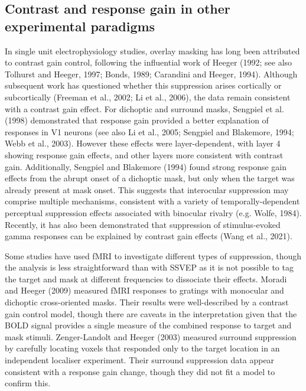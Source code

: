 \documentclass[]{article}
\begin{document}
\hypertarget{contrast-and-response-gain-in-other-experimental-paradigms}{%
\subsection{Contrast and response gain in other experimental paradigms}\label{contrast-and-response-gain-in-other-experimental-paradigms}}

In single unit electrophysiology studies, overlay masking has long been attributed to contrast gain control, following the influential work of Heeger (1992; see also Tolhurst and Heeger, 1997; Bonds, 1989; Carandini and Heeger, 1994). Although subsequent work has questioned whether this suppression arises cortically or subcortically (Freeman et al., 2002; Li et al., 2006), the data remain consistent with a contrast gain effect. For dichoptic and surround masks, Sengpiel et al. (1998) demonstrated that response gain provided a better explanation of responses in V1 neurons (see also Li et al., 2005; Sengpiel and Blakemore, 1994; Webb et al., 2003). However these effects were layer-dependent, with layer 4 showing response gain effects, and other layers more consistent with contrast gain. Additionally, Sengpiel and Blakemore (1994) found strong response gain effects from the abrupt onset of a dichoptic mask, but only when the target was already present at mask onset. This suggests that interocular suppression may comprise multiple mechanisms, consistent with a variety of temporally-dependent perceptual suppression effects associated with binocular rivalry (e.g. Wolfe, 1984). Recently, it has also been demonstrated that suppression of stimulus-evoked gamma responses can be explained by contrast gain effects (Wang et al., 2021).

Some studies have used fMRI to investigate different types of suppression, though the analysis is less straightforward than with SSVEP as it is not possible to tag the target and mask at different frequencies to dissociate their effects. Moradi and Heeger (2009) measured fMRI responses to gratings with monocular and dichoptic cross-oriented masks. Their results were well-described by a contrast gain control model, though there are caveats in the interpretation given that the BOLD signal provides a single measure of the combined response to target and mask stimuli. Zenger-Landolt and Heeger (2003) measured surround suppression by carefully locating voxels that responded only to the target location in an independent localiser experiment. Their surround suppression data appear consistent with a response gain change, though they did not fit a model to confirm this.
\end{document}
